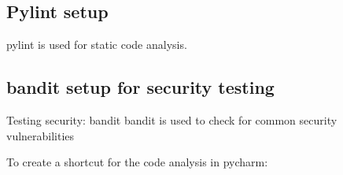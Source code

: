 \subsection{Pylint setup}

pylint is used for static code analysis.

%
%




\subsection{bandit setup for security testing}

Testing security: bandit
bandit is used to check for common security vulnerabilities

To create a shortcut for the code analysis in pycharm:

